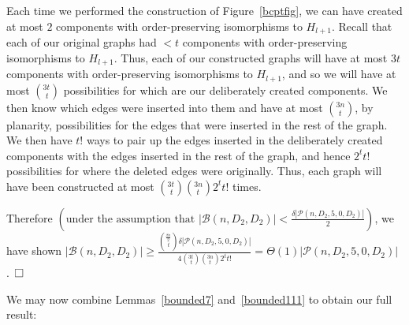 \documentclass{article}
\newtheorem{Proof of Theorem}{Proof of Theorem}
\begin{document}
Each time we performed the construction of Figure~\ref{bcptfig},
we can have created at most $2$ components with order-preserving isomorphisms to $H_{l+1}$.
Recall that each of our original graphs had $<t$ components with order-preserving isomorphisms to $H_{l+1}$.
Thus, each of our constructed graphs will have at most $3t$ components with order-preserving isomorphisms to $H_{l+1}$,
and so we will have at most $\left( ^{3t}_{\phantom{i}t} \right)$
possibilities for which are our deliberately created components.
We then know which edges were inserted into them and have at most 
$\left(^{3n}_{\phantom{i}t} \right)$,
by planarity,
possibilities for the edges that were inserted in the rest of the graph.
We then have $t!$ ways to pair up the edges inserted in the deliberately created components with
the edges inserted in the rest of the graph,
and hence $2^{t}t!$ possibilities for where the deleted edges were originally.
Thus, each graph will have been constructed at most 
$\left(^{3t}_{\phantom{i}t} \right) \left(^{3n}_{\phantom{i}t} \right) 2^{t}t!$ times.

Therefore
$\left( \textrm{under the assumption that }
|\mathcal{B}(n,D_{2},D_{2})| < \frac{\delta |\mathcal{P}(n,D_{2},5,0,D_{2})|}{2} \right)$,
we have shown 
$|\mathcal{B}(n,D_{2},D_{2})| \geq
\frac{\left( ^{\frac{\beta n}{2}}_{\phantom{q}t} \right) \delta|\mathcal{P}(n,D_{2},5,0,D_{2})|}
{4 \left(^{3t}_{\phantom{i}t} \right) \left(^{3n}_{\phantom{i}t} \right) 2^{t}t!}
= \Theta(1) |\mathcal{P}(n,D_{2},5,0,D_{2})|$.~$\setlength{\unitlength}{.25cm}
\begin{picture}(1,1)
\put(0,0){\line(1,0){1}}
\put(0,0){\line(0,1){1}}
\put(1,1){\line(-1,0){1}}
\put(1,1){\line(0,-1){1}}
\end{picture}$ 


\phantom{p}













We may now combine Lemmas~\ref{bounded7} and~\ref{bounded111} to obtain our full result:
\end{document}
